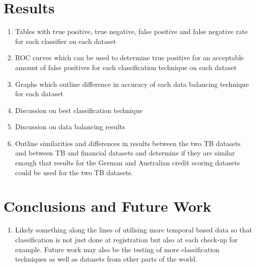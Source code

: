 \documentclass{sig-alternate-05-2015}
\begin{document}
	\section{Results}
	\begin{enumerate}
		\item Tables with true positive, true negative, false positive and false negative rate for each classifier on each dataset
		\item ROC curves which can be used to determine true positive for an acceptable amount of false positives for each classification technique on each dataset
		\item Graphs which outline difference in accuracy of each data balancing technique for each dataset
		\item Discussion on best classification technique
		\item Discussion on data balancing results
		\item Outline similarities and differences in results between the two TB datasets and between TB and financial datasets and determine if they are similar enough that results for the German and Australian credit scoring datasets could be used for the two TB datasets.
	\end{enumerate}
	
	\section{Conclusions and Future Work}
	\begin{enumerate}
		\item Likely something along the lines of utilising more temporal based data so that classification is not just done at registration but also at each check-up for example. Future work may also be the testing of more classification techniques as well as datasets from other parts of the world.
	\end{enumerate}
	
	
\end{document}
